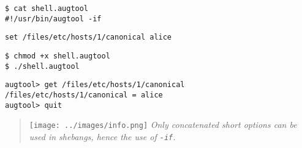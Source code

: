    

\begin{verbatim}
$ cat shell.augtool
#!/usr/bin/augtool -if
\end{verbatim}
\begin{verbatim}
set /files/etc/hosts/1/canonical alice
\end{verbatim}
\begin{verbatim}
$ chmod +x shell.augtool
$ ./shell.augtool
\end{verbatim}
\begin{verbatim}
augtool> get /files/etc/hosts/1/canonical
/files/etc/hosts/1/canonical = alice
augtool> quit
\end{verbatim}

\begin{quote}
\texttt{[image: ../images/info.png]} \emph{Only concatenated short options can be used in shebangs, hence the use of \texttt{-if}.}
\end{quote}
